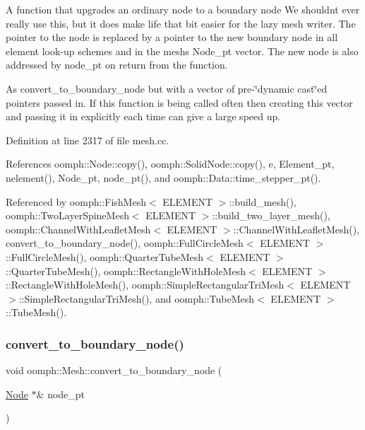 A function that upgrades an ordinary node to a boundary node We shouldn\textquotesingle{}t ever really use this, but it does make life that bit easier for the lazy mesh writer. The pointer to the node is replaced by a pointer to the new boundary node in all element look-\/up schemes and in the mesh\textquotesingle{}s Node\+\_\+pt vector. The new node is also addressed by node\+\_\+pt on return from the function. 

As convert\+\_\+to\+\_\+boundary\+\_\+node but with a vector of pre-\/\char`\"{}dynamic cast\char`\"{}ed pointers passed in. If this function is being called often then creating this vector and passing it in explicitly each time can give a large speed up. 

Definition at line 2317 of file mesh.\+cc.



References oomph\+::\+Node\+::copy(), oomph\+::\+Solid\+Node\+::copy(), e, Element\+\_\+pt, nelement(), Node\+\_\+pt, node\+\_\+pt(), and oomph\+::\+Data\+::time\+\_\+stepper\+\_\+pt().



Referenced by oomph\+::\+Fish\+Mesh$<$ E\+L\+E\+M\+E\+N\+T $>$\+::build\+\_\+mesh(), oomph\+::\+Two\+Layer\+Spine\+Mesh$<$ E\+L\+E\+M\+E\+N\+T $>$\+::build\+\_\+two\+\_\+layer\+\_\+mesh(), oomph\+::\+Channel\+With\+Leaflet\+Mesh$<$ E\+L\+E\+M\+E\+N\+T $>$\+::\+Channel\+With\+Leaflet\+Mesh(), convert\+\_\+to\+\_\+boundary\+\_\+node(), oomph\+::\+Full\+Circle\+Mesh$<$ E\+L\+E\+M\+E\+N\+T $>$\+::\+Full\+Circle\+Mesh(), oomph\+::\+Quarter\+Tube\+Mesh$<$ E\+L\+E\+M\+E\+N\+T $>$\+::\+Quarter\+Tube\+Mesh(), oomph\+::\+Rectangle\+With\+Hole\+Mesh$<$ E\+L\+E\+M\+E\+N\+T $>$\+::\+Rectangle\+With\+Hole\+Mesh(), oomph\+::\+Simple\+Rectangular\+Tri\+Mesh$<$ E\+L\+E\+M\+E\+N\+T $>$\+::\+Simple\+Rectangular\+Tri\+Mesh(), and oomph\+::\+Tube\+Mesh$<$ E\+L\+E\+M\+E\+N\+T $>$\+::\+Tube\+Mesh().

\mbox{\label{classoomph_1_1Mesh_a2bdff104c0cc1f2669f9f5cad4a2a1a9}} 
\subsubsection{\texorpdfstring{convert\+\_\+to\+\_\+boundary\+\_\+node()}{convert\_to\_boundary\_node()}\hspace{0.1cm}{\footnotesize\ttfamily [2/2]}}
{\footnotesize\ttfamily void oomph\+::\+Mesh\+::convert\+\_\+to\+\_\+boundary\+\_\+node (\begin{DoxyParamCaption}\item[{\hyperlink{classoomph_1_1Node}{Node} $\ast$\&}]{node\+\_\+pt }\end{DoxyParamCaption})\hspace{0.3cm}{\ttfamily [protected]}}

